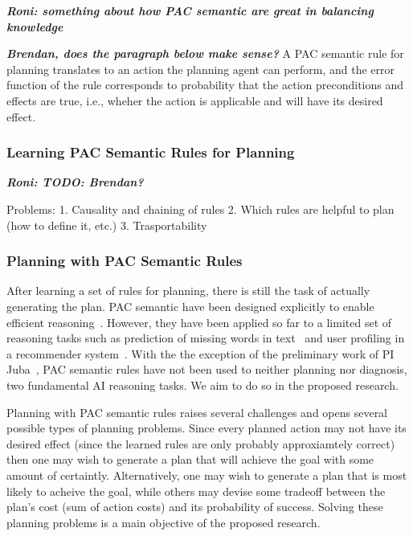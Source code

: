 \documentclass[12pt]{article}
\newcommand{\note}[1]{\textbf{\textit{#1}}}
\begin{document}
\note{Roni: something about how PAC semantic are great in balancing knowledge}


\note{Brendan, does the paragraph below make sense?}
A PAC semantic rule for planning translates to an action the planning agent can perform, and the error function of the rule corresponds to probability that the action preconditions and effects are true, i.e., wheher the action is applicable and will have its desired effect. 


\subsubsection{Learning PAC Semantic Rules for Planning}
\note{Roni: TODO: Brendan?}


Problems: 
1. Causality and chaining of rules
2. Which rules are helpful to plan (how to define it, etc.)
3. Trasportability

\subsubsection{Planning with PAC Semantic Rules}


After learning a set of rules for planning, there is still the task of actually generating the plan. PAC semantic have been designed explicitly to enable efficient reasoning~\cite{valiant2000robustLogics}. However, they have been applied so far to a limited set of reasoning tasks such as prediction of missing words in text~\cite{michael2008first} and user profiling in a recommender system~\cite{semeraro2009knowledge}. With the the exception of the preliminary work of PI Juba~\cite{juba2016aaai,juba2016jmlr}, PAC semantic rules have not been used to neither planning nor diagnosis, two fundamental AI reasoning tasks. We aim to do so in the proposed research. 


Planning with PAC semantic rules raises several challenges and opens several possible types of planning problems.
Since every planned action may not have its desired effect (since the learned rules are only probably approxiamtely correct)
then one may wish to generate a plan that will achieve the goal with some amount of certaintly. 
Alternatively, one may wish to generate a plan that is most likely to acheive the goal, 
while others may devise some tradeoff between the plan's cost (sum of action costs) and its probability of success. 
Solving these planning problems is a main objective of the proposed research. 
\end{document}
